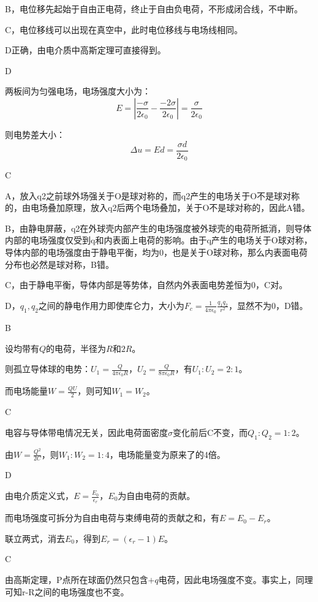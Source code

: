 \documentclass[b5paper,opensource]{qyxf-book}
\begin{document}
B，电位移先起始于自由正电荷，终止于自由负电荷，不形成闭合线，不中断。

C，电位移线可以出现在真空中，此时电位移线与电场线相同。

D正确，由电介质中高斯定理可直接得到。

D

\solve 两板间为匀强电场，电场强度大小为：
\[E=\left|\frac{-\sigma}{2\epsilon_0}-\frac{-2\sigma}{2\epsilon_0}\right|=\frac{\sigma}{2\epsilon_0}\]

则电势差大小：
\[\Delta u=Ed=\frac{\sigma d}{2\epsilon_0}\]

C

\solve A，放入q2之前球外场强关于O是球对称的，而q2产生的电场关于O不是球对称的，由电场叠加原理，放入q2后两个电场叠加，关于O不是球对称的，因此A错。

B，由静电屏蔽，q2在外球壳内部产生的电场强度被外球壳的电荷所抵消，则导体内部的电场强度仅受到q和内表面上电荷的影响。由于q产生的电场关于O球对称，导体内部的电场强度由于静电平衡，均为0，也是关于O球对称，那么内表面电荷分布也必然是球对称，B错。

C，由于静电平衡，导体内部是等势体，自然内外表面电势差恒为0，C对。

D，$ q_1,q_2 $之间的静电作用力即使库仑力，大小为$ F_c=\frac{1}{4\pi\epsilon_0}\frac{q_1q_2}{r^2} $，显然不为0，D错。

B

\solve 设均带有$ Q $的电荷，半径为$ R $和$ 2R $。

则孤立导体球的电势：$ U_1=\frac{Q}{4\pi\epsilon_0R} $，$ U_2=\frac{Q}{8\pi\epsilon_0R} $，有$ U_1:U_2=2:1 $。

而电场能量$ W=\frac{QU}{2} $，则可知$ W_1=W_2 $。

C

\solve 电容与导体带电情况无关，因此电荷面密度$ \sigma $变化前后C不变，而$ Q_1:Q_2=1:2 $。

由$ W=\frac{Q^2}{2C} $，则$ W_1:W_2=1:4 $，电场能量变为原来了的4倍。

D

\solve 由电介质定义式，$ E=\frac{E_0}{\epsilon_r} $，$ E_0 $为自由电荷的贡献。

而电场强度可拆分为自由电荷与束缚电荷的贡献之和，有$ E=E_0-E_r $。

联立两式，消去$ E_0 $，得到$ E_r=(\epsilon_r-1)E $。

C

\solve 由高斯定理，P点所在球面仍然只包含$ +q $电荷，因此电场强度不变。事实上，同理可知r-R之间的电场强度也不变。
\end{document}
